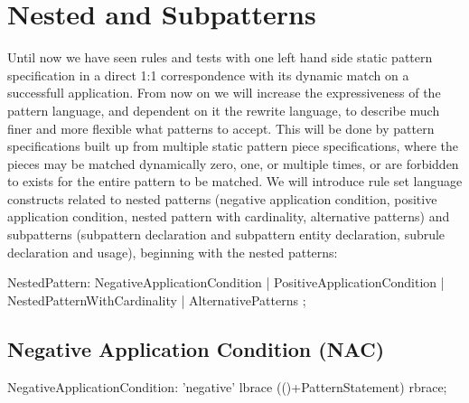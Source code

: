 \chapter{Nested and Subpatterns}
\label{cha:nestedsub}

Until now we have seen rules and tests with one left hand side static pattern specification in a direct 1:1 correspondence with its dynamic match on a successfull application.
From now on we will increase the expressiveness of the pattern language, and dependent on it the rewrite language, to describe much finer and more flexible what patterns to accept.
This will be done by pattern specifications built up from multiple static pattern piece specifications, where the pieces may be matched dynamically zero, one, or multiple times, or are forbidden to exists for the entire pattern to be matched.
We will introduce rule set language constructs related to nested patterns (negative application condition, positive application condition, nested pattern with cardinality, alternative patterns) and subpatterns (subpattern declaration and subpattern entity declaration, subrule declaration and usage), beginning with the nested patterns:

\begin{rail}  
  NestedPattern: 
    NegativeApplicationCondition |
    PositiveApplicationCondition |
    NestedPatternWithCardinality |
    AlternativePatterns 
    ;
\end{rail}

\section{Negative Application Condition (NAC)}
\label{nac}

\begin{rail}  
  NegativeApplicationCondition: 
    'negative' lbrace (()+PatternStatement) rbrace;
\end{rail}

